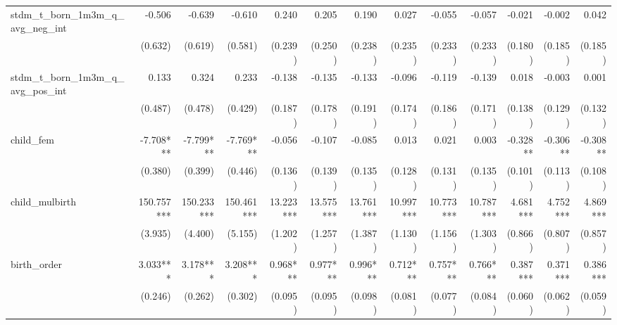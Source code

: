 \begin{tabular}{lrrrrrrrrrrrr}
stdm\_t\_born\_1m3m\_q\_avg\_neg\_int       &       -0.506 &       -0.639 &       -0.610 &        0.240 &        0.205 &        0.190 &        0.027 &       -0.055 &       -0.057 &       -0.021 &       -0.002 &        0.042 \\ 
                                            &      (0.632) &      (0.619) &      (0.581) &      (0.239) &      (0.250) &      (0.238) &      (0.235) &      (0.233) &      (0.233) &      (0.180) &      (0.185) &      (0.185) \\ 
stdm\_t\_born\_1m3m\_q\_avg\_pos\_int       &        0.133 &        0.324 &        0.233 &       -0.138 &       -0.135 &       -0.133 &       -0.096 &       -0.119 &       -0.139 &        0.018 &       -0.003 &        0.001 \\ 
                                            &      (0.487) &      (0.478) &      (0.429) &      (0.187) &      (0.178) &      (0.191) &      (0.174) &      (0.186) &      (0.171) &      (0.138) &      (0.129) &      (0.132) \\ 
child\_fem                                  &    -7.708*** &    -7.799*** &    -7.769*** &       -0.056 &       -0.107 &       -0.085 &        0.013 &        0.021 &        0.003 &     -0.328** &     -0.306** &     -0.308** \\ 
                                            &      (0.380) &      (0.399) &      (0.446) &      (0.136) &      (0.139) &      (0.135) &      (0.128) &      (0.131) &      (0.135) &      (0.101) &      (0.113) &      (0.108) \\ 
child\_mulbirth                             &   150.757*** &   150.233*** &   150.461*** &    13.223*** &    13.575*** &    13.761*** &    10.997*** &    10.773*** &    10.787*** &     4.681*** &     4.752*** &     4.869*** \\ 
                                            &      (3.935) &      (4.400) &      (5.155) &      (1.202) &      (1.257) &      (1.387) &      (1.130) &      (1.156) &      (1.303) &      (0.866) &      (0.807) &      (0.857) \\ 
birth\_order                                &     3.033*** &     3.178*** &     3.208*** &     0.968*** &     0.977*** &     0.996*** &     0.712*** &     0.757*** &     0.766*** &     0.387*** &     0.371*** &     0.386*** \\ 
                                            &      (0.246) &      (0.262) &      (0.302) &      (0.095) &      (0.095) &      (0.098) &      (0.081) &      (0.077) &      (0.084) &      (0.060) &      (0.062) &      (0.059) \\ 

\end{tabular}
